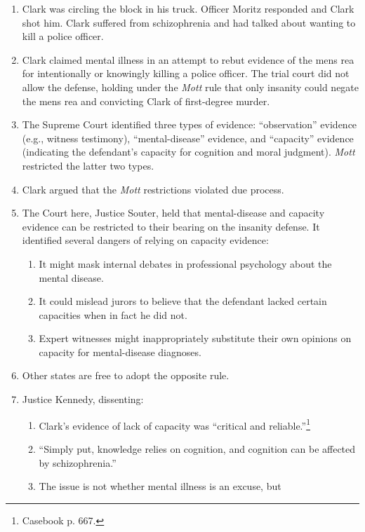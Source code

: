\begin{enumerate}
    \item Clark was circling the block in his truck. Officer Moritz responded 
    and Clark shot him. Clark suffered from schizophrenia and had talked about 
    wanting to kill a police officer.
    \item Clark claimed mental illness in an attempt to rebut evidence of the 
    mens rea for intentionally or knowingly killing a police officer. The 
    trial court did not allow the defense, holding under the \emph{Mott} rule 
    that only insanity could negate the mens rea and convicting Clark of 
    first-degree murder.
    \item The Supreme Court identified three types of evidence: 
    ``observation'' evidence (e.g., witness testimony), ``mental-disease'' 
    evidence, and ``capacity'' evidence (indicating the defendant's capacity 
    for cognition and moral judgment). \emph{Mott} restricted the latter two 
    types.
    \item Clark argued that the \emph{Mott} restrictions violated due process.
    \item The Court here, Justice Souter, held that mental-disease and 
    capacity evidence can be restricted to their bearing on the insanity 
    defense. It identified several dangers of relying on capacity evidence:
    \begin{enumerate}
        \item It might mask internal debates in professional psychology about 
        the mental disease.
        \item It could mislead jurors to believe that the defendant lacked 
        certain capacities when in fact he did not.
        \item Expert witnesses might inappropriately substitute their own 
        opinions on capacity for mental-disease diagnoses.
    \end{enumerate}
    \item Other states are free to adopt the opposite rule.
    \item Justice Kennedy, dissenting:
    \begin{enumerate}
        \item Clark's evidence of lack of capacity was ``critical and 
        reliable.''\footnote{Casebook p. 667.}
        \item ``Simply put, knowledge relies on cognition, and cognition can 
        be affected by schizophrenia.''
        \item The issue is not whether mental illness is an excuse, but 

\end{enumerate}
\end{enumerate}
